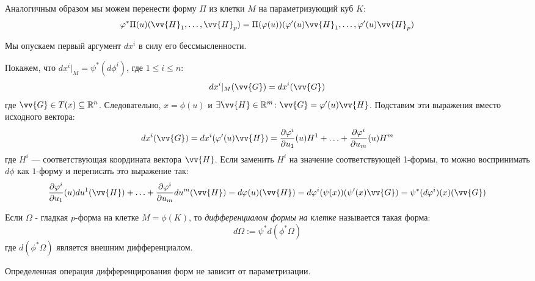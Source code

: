 \begin{note}
	Аналогичным образом мы можем перенести форму $\Pi$ из клетки $M$ на параметризующий куб $K$:
	\[
		\phi^*\Pi(u)(\vv{H}_1, \ldots, \vv{H}_p) = \Pi(\phi(u))(\phi'(u)\vv{H}_1, \ldots, \phi'(u)\vv{H}_p)
	\]
\end{note}

\begin{reminder}
	Мы опускаем первый аргумент $dx^i$ в силу его бессмысленности.
\end{reminder}

\begin{example}
	Покажем, что $dx^i|_M = \psi^*(d\phi^i)$, где $1 \le i \le n$:
	\[
		dx^i|_M(\vv{G}) = dx^i(\vv{G})
	\]
	где $\vv{G} \in T(x) \subseteq \R^n$. Следовательно, $x = \phi(u)$ и $\exists \vv{H} \in \R^m \colon \vv{G} = \phi'(u)\vv{H}$. Подставим эти выражения вместо исходного вектора:
	\[
		dx^i(\vv{G}) = dx^i(\phi'(u)\vv{H}) = \pd{\phi^i}{u_1}(u)H^1 + \ldots + \pd{\phi^i}{u_m}(u)H^m
	\]
	где $H^i$ --- соответствующая координата вектора $\vv{H}$. Если заменить $H^i$ на значение соответствующей 1-формы, то можно воспринимать $d\phi$ как $1$-форму и переписать это выражение так:
	\[
		\pd{\phi^i}{u_1}(u)du^1(\vv{H}) + \ldots + \pd{\phi^i}{u_m}du^m(\vv{H}) = d\phi(u)(\vv{H}) = d\phi^i(\psi(x))(\psi'(x)\vv{G}) = \psi^*(d\phi^i)(x)(\vv{G})
	\]
\end{example}

\begin{definition}
	Если $\Omega$ - гладкая $p$-форма на клетке $M = \phi(K)$, то \textit{дифференциалом формы на клетке} называется такая форма:
	\[
		d\Omega := \psi^*d(\phi^*\Omega)
	\]
	где $d(\phi^*\Omega)$ является внешним дифференциалом.
\end{definition}

\begin{lemma}
	Определенная операция дифференцирования форм не зависит от параметризации.
\end{lemma}

